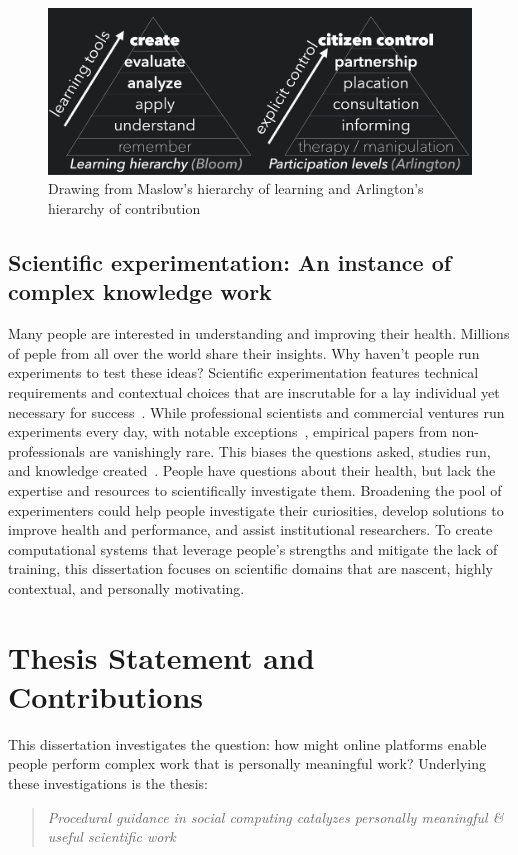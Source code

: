 \begin{figure}[!h] 
  \centering
 \includegraphics[width=1.0\textwidth]{figures/intro/intro-taxonomy}
  \caption[Drawing from Maslow's hierarchy of learning and  hierarchy of contribution]
{Drawing from Maslow's hierarchy of learning and Arlington's hierarchy of contribution}
  \label{fig:intro-taxonomy}
\end{figure}

\subsection{Scientific experimentation: An instance of complex knowledge work}
Many people are interested in understanding and improving their health. Millions of peple from all over the world share their insights. 
Why haven't people run experiments to test these ideas? Scientific experimentation features technical requirements and contextual choices 
that are inscrutable for a lay individual yet necessary for success~\cite{Martin2007}. While 
professional scientists and commercial ventures run experiments every day, with 
notable exceptions~\cite{Cooper2010,DanaLewis}, empirical papers from non-professionals are 
vanishingly rare. This biases the questions asked, studies run, and knowledge 
created~\cite{Henrich2010a}. People have questions about their health, but lack the expertise 
and resources to scientifically investigate them. Broadening the pool of 
experimenters could help people investigate their curiosities, develop solutions 
to improve health and performance, and assist institutional researchers. To create computational systems that leverage people's strengths and mitigate the lack of training, this dissertation focuses on scientific domains that are nascent, highly contextual, and personally motivating.

\section{Thesis Statement and Contributions}
This dissertation investigates the question: how might online platforms enable people perform 
complex work that is personally meaningful work? Underlying these investigations is the thesis:\\
\begin{quote}
\emph{Procedural guidance in social computing catalyzes personally meaningful \& useful scientific work}
\end{quote}

